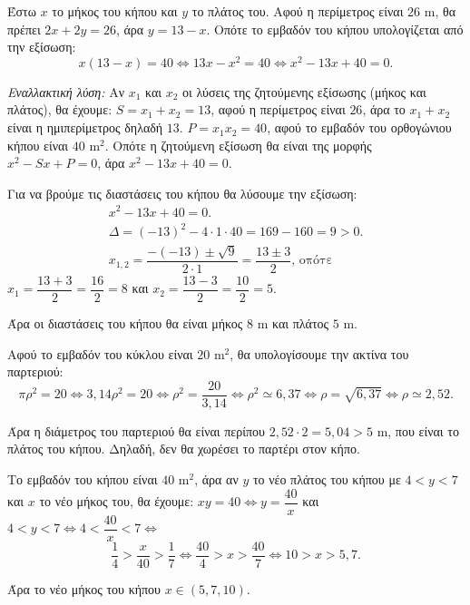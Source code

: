 
\begin{alist}
\item Έστω $x$ το μήκος του κήπου και $y$ το πλάτος του. Αφού η περίμετρος είναι $26\text{ m}$, θα πρέπει $2x + 2y = 26$, άρα $y = 13 - x$.
Οπότε το εμβαδόν του κήπου υπολογίζεται από την εξίσωση:
\[x(13 - x) = 40 \Leftrightarrow 13x - x^2 = 40 \Leftrightarrow x^2 - 13x + 40 = 0.\]

\textit{Εναλλακτική λύση:}
Αν $x_1$ και $x_2$ οι λύσεις της ζητούμενης εξίσωσης (μήκος και πλάτος), θα έχουμε:
$S = x_1 + x_2 = 13$, αφού η περίμετρος είναι $26$, άρα το $x_1 + x_2$ είναι η ημιπερίμετρος δηλαδή $13$.
$P = x_1 x_2 = 40$, αφού το εμβαδόν του ορθογώνιου κήπου είναι $40\text{ m}^2$.
Οπότε η ζητούμενη εξίσωση θα είναι της μορφής $x^2 - Sx + P = 0$, άρα
$x^2 - 13x + 40 = 0$.

\item Για να βρούμε τις διαστάσεις του κήπου θα λύσουμε την εξίσωση:
\begin{gather*}
x^2 - 13x + 40 = 0. \\
\Delta = (-13)^2 - 4 \cdot 1 \cdot 40 = 169 - 160 = 9 > 0. \\
x_{1,2} = \dfrac{-(-13) \pm \sqrt{9}}{2 \cdot 1} = \dfrac{13 \pm 3}{2}\text{, οπότε}
\end{gather*}
$x_1 = \dfrac{13 + 3}{2} = \dfrac{16}{2} = 8$ και $x_2 = \dfrac{13 - 3}{2} = \dfrac{10}{2} = 5$.

Άρα οι διαστάσεις του κήπου θα είναι μήκος $8\text{ m}$ και πλάτος $5\text{ m}$.

\item Αφού το εμβαδόν του κύκλου είναι $20\text{ m}^2$, θα υπολογίσουμε την ακτίνα του παρτεριού:
\[\pi \rho^2 = 20 \Leftrightarrow 3,14\rho^2 = 20 \Leftrightarrow \rho^2 = \dfrac{20}{3,14} \Leftrightarrow \rho^2 \simeq 6,37 \Leftrightarrow \rho = \sqrt{6,37} \Leftrightarrow \rho \simeq 2,52.\]

Άρα η διάμετρος του παρτεριού θα είναι περίπου $2,52 \cdot 2 = 5,04 > 5\text{ m}$, που είναι το πλάτος του κήπου. Δηλαδή, δεν θα χωρέσει το παρτέρι στον κήπο.

\item Το εμβαδόν του κήπου είναι $40\text{ m}^2$, άρα αν $y$ το νέο πλάτος του κήπου με $4 < y < 7$ και $x$ το νέο μήκος του, θα έχουμε: $xy = 40 \Leftrightarrow y = \dfrac{40}{x}$ και $4 < y < 7 \Leftrightarrow 4 < \dfrac{40}{x} < 7 \Leftrightarrow$
\[\dfrac{1}{4} > \dfrac{x}{40} > \dfrac{1}{7} \Leftrightarrow \dfrac{40}{4} > x > \dfrac{40}{7} \Leftrightarrow 10 > x > 5,7.\]

Άρα το νέο μήκος του κήπου $x \in (5,7, 10)$.
\end{alist}


